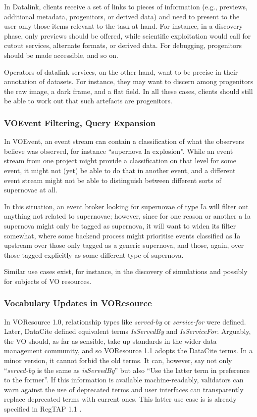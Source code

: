 \documentclass[11pt,a4paper]{ivoa}
\newcommand{\vocterm}[1]{\emph{\color{termcolor}#1}}
\begin{document}
In Datalink, clients receive a set of links
to pieces of information (e.g., previews, additional metadata,
progenitors, or
derived data) and need to present to the user only those items
relevant to the task at hand.  For instance, in a discovery phase, only
previews should be offered, while scientific exploitation would call for
cutout services, alternate formats, or derived data.  For debugging,
progenitors should be made accessible, and so on.

Operators of datalink services, on the other hand, want to be precise in
their annotation of datasets.  For instance, they may want to discern
among progenitors the raw image, a dark frame, and a flat field.  In all
these cases, clients should still be able to work out that such
artefacts are progenitors.

\subsubsection{VOEvent Filtering, Query Expansion}
\label{uc:filtering}

In VOEvent, an event stream can contain a classification of what the
observers believe was observed, for instance ``supernova Ia explosion''.
While an event stream from one project might provide a classification on
that level for some event, it might not (yet) be able to do that in
another event, and a different event stream might not be able to
distinguish between different sorts of supernovae at all.

In this situation, an event broker looking for supernovae of type Ia
will filter out anything not related to supernovae; however, since for
one reason or another a Ia supernova might only be tagged as supernova,
it will want to widen its filter somewhat, where some backend process
might prioritise events classified as Ia upstream over those only tagged
as a generic supernova, and those, again, over those tagged explicitly
as some different type of supernova.

Similar use cases exist, for instance, in the discovery of simulations
and possibly for subjects of VO resources.


\subsubsection{Vocabulary Updates in VOResource}
\label{uc:deprecation}

In VOResource 1.0, relationship types like \vocterm{served-by} or
\vocterm{service-for} were defined.  Later, DataCite defined equivalent
terms \vocterm{IsServedBy} and \vocterm{IsServiceFor}.  Arguably, the VO should,
as far as sensible, take up standards in the wider data management
community, and so VOResource 1.1 adopts the DataCite terms.  In a minor
version, it cannot forbid the old terms.  It can, however, say not only
``\vocterm{served-by\/} is the same as \vocterm{isServedBy}'' but also
``Use the latter term in preference to the former''.  If this information is
available machine-readably, validators can warn against the use of
deprecated terms and user interfaces can transparently replace 
deprecated terms with current ones.  This latter use case is is
already specified in RegTAP 1.1 \citep{2019ivoa.spec.1011D}.
\end{document}
